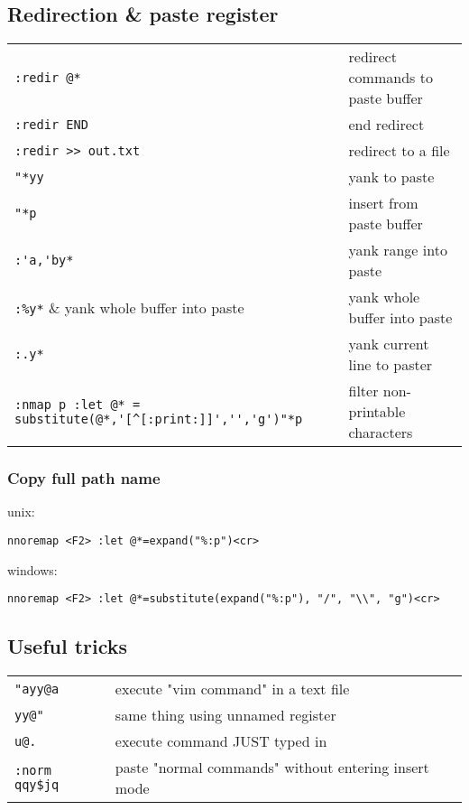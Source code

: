 \subsection{Redirection \& paste register}
\begin{center}
\begin{longtable}{l|l}
 \verb!:redir @*! & redirect commands to paste buffer\\
 \verb!:redir END! & end redirect\\
 \verb!:redir >> out.txt! & redirect to a file\\
 \verb!"*yy! & yank to paste\\
 \verb!"*p! & insert from paste buffer\\
 \verb!:'a,'by*! & yank range into paste\\
 \verb!:%y*! & yank whole buffer into paste\\
 \verb!:.y*! & yank current line to paster\\
 \verb!:nmap p :let @* = substitute(@*,'[^[:print:]]','','g')"*p! & filter non-printable characters\
\end{longtable}
\end{center}

\subsubsection{Copy full path name}
unix:
\begin{verbatim}
nnoremap <F2> :let @*=expand("%:p")<cr>
\end{verbatim}

windows:
\begin{verbatim}
nnoremap <F2> :let @*=substitute(expand("%:p"), "/", "\\", "g")<cr>
\end{verbatim}

\subsection{Useful tricks}
\begin{center}
\begin{longtable}{l|l}
 \verb!"ayy@a! & execute "vim command" in a text file\\
 \verb!yy@"! & same thing using unnamed register\\
 \verb!u@.! & execute command JUST typed in\\
 \verb!:norm qqy$jq! &  paste "normal commands" without entering insert mode
 \end{longtable}
\end{center}
